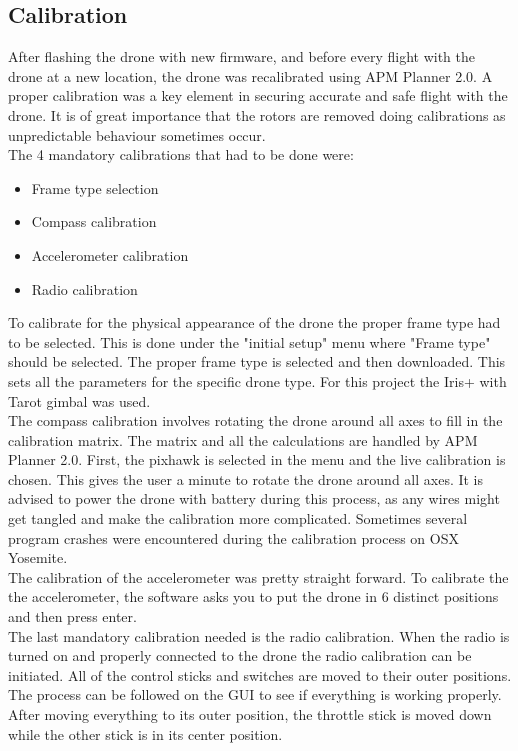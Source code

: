 \subsection*{Calibration}
After flashing the drone with new firmware, and before every flight with the drone at a new location,
the drone was recalibrated using APM Planner 2.0.
A proper calibration was a key element in securing accurate and safe
flight with the drone. It is of great importance that the rotors are removed doing calibrations as
unpredictable behaviour sometimes occur.\\
The 4 mandatory calibrations that had to be done were:
\begin{itemize}
\item Frame type selection
\item Compass calibration
\item Accelerometer calibration
\item Radio calibration
\end{itemize}

To calibrate for the physical appearance of the drone the proper frame type had to be selected.
This is done under the "initial setup" menu where "Frame type" should be selected. The proper frame
type
is selected and then downloaded. This sets all the parameters for the specific drone type. For this
project the Iris+ with Tarot gimbal was used.\\

The compass calibration involves rotating the drone around all axes to fill in the calibration
matrix. The matrix and all the calculations are handled by APM Planner 2.0. First, the pixhawk is
selected in the menu and the live calibration is chosen. This gives the user a minute to rotate the
drone around all axes. It is advised to power the drone with battery during this process,
as any wires might get tangled
and make the calibration more complicated.
Sometimes several program crashes were encountered during the
calibration process on OSX Yosemite.\\

The calibration of the accelerometer was pretty straight forward. To calibrate the the
accelerometer, the software asks you to put the drone in 6 distinct positions and then press enter.\\

The last mandatory calibration needed is the radio calibration. When the radio is turned on and
properly connected to the drone the radio calibration can be initiated. All of the control sticks
and switches are moved to their outer positions. The process can be followed on the GUI to see if
everything is working properly. After moving everything to its outer position, the throttle stick is
moved down while the other stick is in its center position.\\

